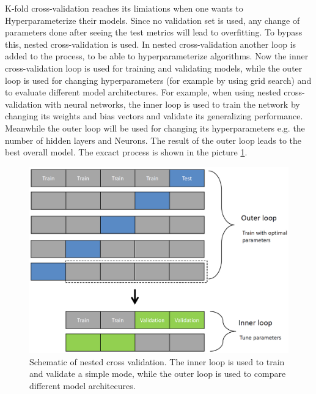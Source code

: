 \begin{questions}
K-fold cross-validation reaches its limiations when one wants to Hyperparameterize their models. Since no validation set is used, any change of parameters done after seeing the test metrics will lead to overfitting. To bypass this, nested cross-validation is used. In nested cross-validation another loop is added to the process, to be able to hyperparameterize algorithms. Now the inner cross-validation loop is used for training and validating models, while the outer loop is used for changing hyperparameters (for example by using grid search) and to evaluate different model architectures. For example, when using nested cross-validation with neural networks, the inner loop is used to train the network by changing its weights and bias vectors and validate its generalizing performance. Meanwhile the outer loop will be used for changing its hyperparameters e.g. the number of hidden layers and Neurons. The result of the outer loop leads to the best overall model. The excact process is shown in the picture \ref{fig:ncv}.

\begin{figure}[H]
	\includegraphics[width=0.8\linewidth]{pictures/nested_cross_validation.png}
	\centering
	\caption{Schematic of nested cross validation. The inner loop is used to train and validate a simple mode, while the outer loop is used to compare different model architecures.}
	\label{fig:ncv}
\end{figure}

\begin{answer}
\end{answer}

\end{questions}
